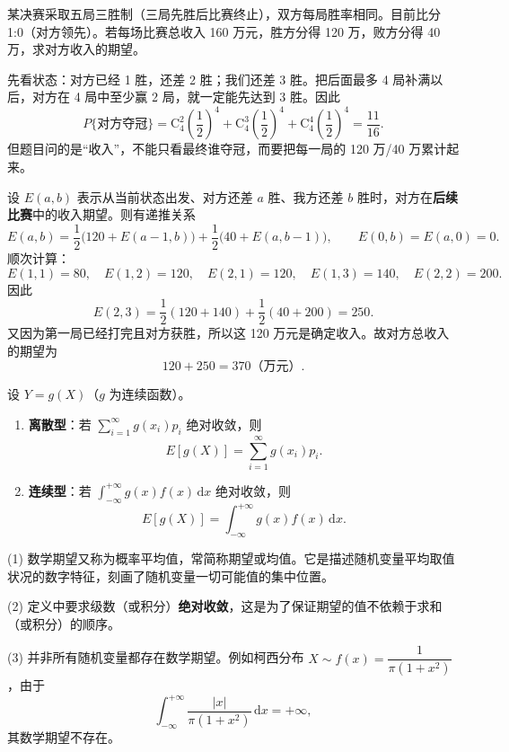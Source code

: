﻿\documentclass[lang=cn,11pt]{elegantbook}
\begin{document}
\begin{exercise}\label{exer:4-basketball}
某决赛采取五局三胜制（三局先胜后比赛终止），双方每局胜率相同。目前比分 1:0（对方领先）。若每场比赛总收入 160 万元，胜方分得 120 万，败方分得 40 万，求对方收入的期望。
\end{exercise}
\begin{solution}
先看状态：对方已经 1 胜，还差 2 胜；我们还差 3 胜。把后面最多 4 局补满以后，对方在 4 局中至少赢 2 局，就一定能先达到 3 胜。因此
\[
P\{\text{对方夺冠}\} = \mathrm{C}_4^2\!\left(\frac{1}{2}\right)^{\!4} + \mathrm{C}_4^3\!\left(\frac{1}{2}\right)^{\!4} + \mathrm{C}_4^4\!\left(\frac{1}{2}\right)^{\!4} = \frac{11}{16}.
\]
但题目问的是“收入”，不能只看最终谁夺冠，而要把每一局的 120 万/40 万累计起来。

设 \(E(a,b)\) 表示从当前状态出发、对方还差 \(a\) 胜、我方还差 \(b\) 胜时，对方在\textbf{后续比赛}中的收入期望。则有递推关系
\[
E(a,b)=\frac12\bigl(120+E(a-1,b)\bigr)+\frac12\bigl(40+E(a,b-1)\bigr),\qquad E(0,b)=E(a,0)=0.
\]
顺次计算：
\[
E(1,1)=80,\quad E(1,2)=120,\quad E(2,1)=120,\quad E(1,3)=140,\quad E(2,2)=200.
\]
因此
\[
E(2,3)=\frac12(120+140)+\frac12(40+200)=250.
\]
又因为第一局已经打完且对方获胜，所以这 120 万元是确定收入。故对方总收入的期望为
\[
120+250=370\text{（万元）}.
\]
\end{solution}

\begin{definition}[随机变量函数的期望] \label{def:function-expectation}
设 \(Y = g(X)\)（\(g\) 为连续函数）。
\begin{enumerate}
    \item \textbf{离散型}：若 \(\sum\limits_{i=1}^{\infty} g(x_i) p_i\) 绝对收敛，则
    \[
    E[g(X)] = \sum_{i=1}^{\infty} g(x_i) p_i.
    \]
    \item \textbf{连续型}：若 \(\int_{-\infty}^{+\infty} g(x) f(x)\,\mathrm{d}x\) 绝对收敛，则
    \[
    E[g(X)] = \int_{-\infty}^{+\infty} g(x) f(x)\,\mathrm{d}x.
    \]
\end{enumerate}
\end{definition}

\begin{note}
(1) 数学期望又称为概率平均值，常简称期望或均值。它是描述随机变量平均取值状况的数字特征，刻画了随机变量一切可能值的集中位置。\par
(2) 定义中要求级数（或积分）\textbf{绝对收敛}，这是为了保证期望的值不依赖于求和（或积分）的顺序。\par
(3) 并非所有随机变量都存在数学期望。例如柯西分布 \(X\sim f(x)=\dfrac{1}{\pi(1+x^2)}\)，由于
\[
\int_{-\infty}^{+\infty}\frac{|x|}{\pi(1+x^2)}\,\mathrm{d}x = +\infty,
\]
其数学期望不存在。
\end{note}
\end{document}
